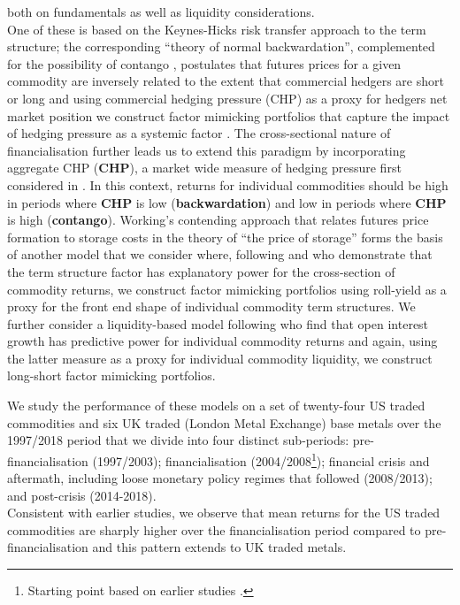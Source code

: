 \documentclass[
  authoryear,
  preprint,
  3p]{elsarticle}
\begin{document}
both on fundamentals as well as liquidity considerations.\\
One of these is based on the Keynes-Hicks
\citep{keynes_some_1923, keynes_treatise_1930, hicks_value_1939, hicks_value_1946}
risk transfer approach to the term structure; the corresponding ``theory
of normal backwardation'', complemented for the possibility of contango
\citep{houthakker_restatement_1957, cootner_returns_1960}, postulates
that futures prices for a given commodity are inversely related to the
extent that commercial hedgers are short or long and using commercial
hedging pressure (CHP) as a proxy for hedgers net market position we
construct factor mimicking portfolios that capture the impact of hedging
pressure as a systemic factor \citep{basu_capturing_2013}. The
cross-sectional nature of financialisation
\citep{cheng_financialisation_2014, basak_model_2016} further leads us
to extend this paradigm by incorporating aggregate CHP (\textbf{CHP}), a
market wide measure of hedging pressure first considered in
\citet{hong_what_2012}. In this context, returns for individual
commodities should be high in periods where \textbf{CHP} is low
(\textbf{backwardation}) and low in periods where \textbf{CHP} is high
(\textbf{contango}). Working's contending approach that relates futures
price formation to storage costs in the theory of ``the price of
storage'' \citep{working_theory_1949} forms the basis of another model
that we consider where, following \citet{szymanowska_anatomy_2014} and
\citet{fuertes_commodity_2015} who demonstrate that the term structure
factor has explanatory power for the cross-section of commodity returns,
we construct factor mimicking portfolios using roll-yield as a proxy for
the front end shape of individual commodity term structures. We further
consider a liquidity-based model following \citet{hong_what_2012} who
find that open interest growth has predictive power for individual
commodity returns and again, using the latter measure as a proxy for
individual commodity liquidity, we construct long-short factor mimicking
portfolios.

\bigskip
\bigskip

We study the performance of these models on a set of twenty-four US
traded commodities and six UK traded (London Metal Exchange) base metals
over the 1997/2018 period that we divide into four distinct sub-periods:
pre-financialisation (1997/2003); financialisation
(2004/2008\footnote{Starting point based on earlier studies
  \citep{baker_financialization_2021, christoffersen_factor_2014}.});
financial crisis and aftermath, including loose monetary policy regimes
that followed (2008/2013); and post-crisis (2014-2018).\\
Consistent with earlier studies, we observe that mean returns for the US
traded commodities are sharply higher over the financialisation period
compared to pre-financialisation and this pattern extends to UK traded
metals.
\end{document}
